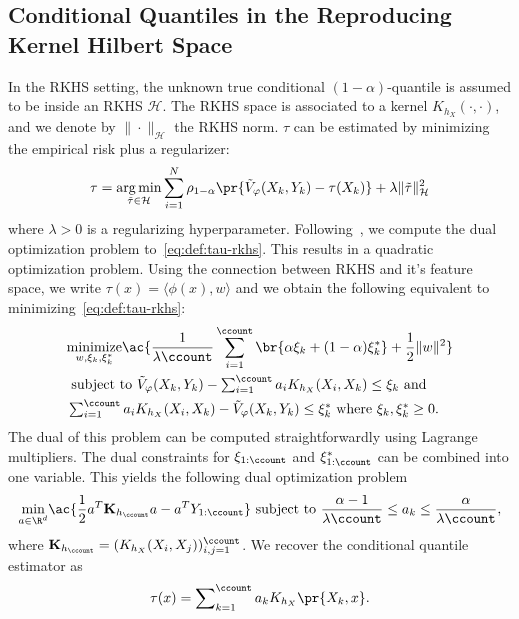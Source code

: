 
\subsection{Conditional Quantiles in the Reproducing Kernel Hilbert Space}
  In the RKHS setting, the unknown true conditional $(1-\alpha)$-quantile is assumed to be inside an RKHS $\mathcal{H}$.
  The RKHS space is associated to a kernel $K_{h_{X}}(\cdot,\cdot)$, and we denote by $\|\cdot\|_{\mathcal{H}}$ the RKHS norm. $\tau$ can be estimated by minimizing the empirical risk plus a regularizer:
  \begin{equation}\label{eq:def:tau-rkhs}
    \tau
    = \underset{\tilde{\tau} \in \mathcal{H}}{\arg \min } \sum_{i=1}^N \rho_{1-\alpha}\pr{\tilde{V}_{\varphi}(X_{k},Y_{k})-\tau(X_{k})} + \lambda \|\tilde{\tau}\|_{\mathcal{H}}^2
  \end{equation}
  where $\lambda > 0$ is a regularizing hyperparameter.
  Following~\cite{takeuchi2006nonparametric}, we compute the dual optimization problem to~\eqref{eq:def:tau-rkhs}. This results in a quadratic optimization problem. 
  Using the connection between RKHS and it's feature space, we write $\tau(x) = \langle \phi(x), w \rangle$ and we obtain the following equivalent to minimizing~\eqref{eq:def:tau-rkhs}:
  \begin{align*}
    &\underset{w, \xi_{k}, \xi_{k}^{*}}{\operatorname{minimize}}
    \ac{
      \frac{1}{\lambda \ccount}\sum_{i=1}^{\ccount} \br{\alpha \xi_{k}+(1-\alpha) \xi_{k}^*}
      + \frac{1}{2} \|w\|^2
    }
    \\
    &
    \text { subject to } 
    \tilde{V}_{\varphi}(X_{k},Y_{k}) - \textstyle \sum_{i=1}^{\ccount} a_{i} K_{h_{X}}(X_{i}, X_k)
    \le \xi_{k} \text { and }
    \\
    &
    \textstyle \sum_{i=1}^{\ccount} a_{i} K_{h_{X}}(X_{i}, X_k) -\tilde{V}_{\varphi}(X_{k},Y_{k}) 
    \le \xi_{k}^* \text { where } \xi_{k}, \xi_{k}^* 
    \ge 0.
  \end{align*}
  The dual of this problem can be computed straightforwardly using Lagrange multipliers. The dual constraints for $\xi_{1:\ccount}$ and $\xi_{1:\ccount}^*$ can be combined into one variable. This yields the following dual optimization problem
  \begin{equation*}
    \underset{a\in\R^d}{\min} \ac{ \frac{1}{2} a^{T} \mathbf{K}_{h_{\ccount}} a-a^{T} Y_{1:\ccount} } 
    \text { subject to } \frac{\alpha-1}{\lambda \ccount} \le a_{k} \le \frac{\alpha}{\lambda \ccount}
    ,
  \end{equation*}
  where $\mathbf{K}_{h_{\ccount}}=(K_{h_{X}}(X_i,X_j))_{i,j=1}^{\ccount}$.
  We recover the conditional quantile estimator as
  \begin{equation*}
    \tau(x)=\sum\nolimits_{k=1}^{\ccount} a_{k} K_{h_{X}}\pr{X_{k}, x}.  
  \end{equation*}
